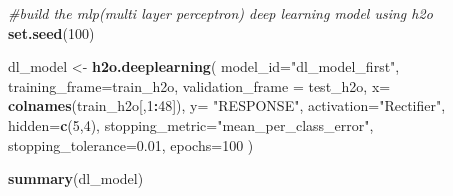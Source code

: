 \documentclass[]{article}
\newenvironment{Shaded}{\begin{snugshade}}{\end{snugshade}}
\newcommand{\KeywordTok}[1]{\textcolor[rgb]{0.13,0.29,0.53}{\textbf{#1}}}
\newcommand{\DataTypeTok}[1]{\textcolor[rgb]{0.13,0.29,0.53}{#1}}
\newcommand{\DecValTok}[1]{\textcolor[rgb]{0.00,0.00,0.81}{#1}}
\newcommand{\FloatTok}[1]{\textcolor[rgb]{0.00,0.00,0.81}{#1}}
\newcommand{\StringTok}[1]{\textcolor[rgb]{0.31,0.60,0.02}{#1}}
\newcommand{\CommentTok}[1]{\textcolor[rgb]{0.56,0.35,0.01}{\textit{#1}}}
\newcommand{\OperatorTok}[1]{\textcolor[rgb]{0.81,0.36,0.00}{\textbf{#1}}}
\newcommand{\NormalTok}[1]{#1}
\begin{document}
\begin{Shaded}
\begin{Highlighting}[]
\CommentTok{#build the mlp(multi layer perceptron) deep learning model using h2o}
\KeywordTok{set.seed}\NormalTok{(}\DecValTok{100}\NormalTok{)}

\NormalTok{dl_model <-}\StringTok{ }\KeywordTok{h2o.deeplearning}\NormalTok{(}
  \DataTypeTok{model_id=}\StringTok{"dl_model_first"}\NormalTok{, }
  \DataTypeTok{training_frame=}\NormalTok{train_h2o, }
  \DataTypeTok{validation_frame =}\NormalTok{ test_h2o,}
  \DataTypeTok{x=} \KeywordTok{colnames}\NormalTok{(train_h2o[,}\DecValTok{1}\OperatorTok{:}\DecValTok{48}\NormalTok{]),}
  \DataTypeTok{y=} \StringTok{"RESPONSE"}\NormalTok{,}
  \DataTypeTok{activation=}\StringTok{"Rectifier"}\NormalTok{,  }
  \DataTypeTok{hidden=}\KeywordTok{c}\NormalTok{(}\DecValTok{5}\NormalTok{,}\DecValTok{4}\NormalTok{), }
  \DataTypeTok{stopping_metric=}\StringTok{"mean_per_class_error"}\NormalTok{,}
  \DataTypeTok{stopping_tolerance=}\FloatTok{0.01}\NormalTok{,}
  \DataTypeTok{epochs=}\DecValTok{100}        
\NormalTok{)}
\end{Highlighting}
\end{Shaded}

\begin{Shaded}
\begin{Highlighting}[]
\KeywordTok{summary}\NormalTok{(dl_model)}
\end{Highlighting}
\end{Shaded}
\end{document}
